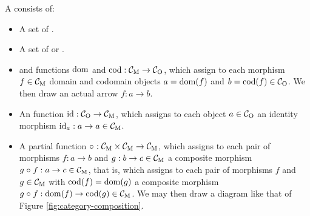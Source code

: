 \begin{definition}
  [Category]



  \label{def:category}


  A   consists of:
  \begin{itemize}
  \item

    A set of  .

  \item

    A set of  or  .

  \item

     and  functions $\operatorname{dom}$ and $\operatorname{cod}:
    \mathcal{C}_{\operatorname{M}} \to \mathcal{C}_{\operatorname{O}}$, which assign to each morphism $f \in
    \mathcal{C}_{\operatorname{M}}$ domain and codomain objects $a = \operatorname{dom}(f)$ and $b =
    \operatorname{cod}(f) \in \mathcal{C}_{\operatorname{O}}$. We then draw an actual arrow $f: a \to b$.

  \item

    An  function $\operatorname{id}: \mathcal{C}_{\operatorname{O}} \to \mathcal{C}_{\operatorname{M}}$, which
    assigns to each object $a \in \mathcal{C}_{\operatorname{O}}$ an identity morphism
    $\operatorname{id}_{a}: a \to a \in \mathcal{C}_{\operatorname{M}}$.

  \item

    A  partial function $\mathrel{\circ}\ : \mathcal{C}_{\operatorname{M}} \times
    \mathcal{C}_{\operatorname{M}} \to \mathcal{C}_{\operatorname{M}}$, which assigns to each pair of morphisms
    $f: a \to b$ and $g: b \to c \in \mathcal{C}_{\operatorname{M}}$ a composite morphism $g
    \mathrel{\circ} f: a \to c \in \mathcal{C}_{\operatorname{M}}$, that is, which assigns to each
    pair of morphisms $f$ and $g \in \mathcal{C}_{\operatorname{M}}$ with $\operatorname{cod}(f) =
    \operatorname{dom}(g)$ a composite morphism $g \mathrel{\circ} f: \operatorname{dom}(f) \to \operatorname{cod}(g) \in
    \mathcal{C}_{\operatorname{M}}$. We may then draw a diagram like that of Figure
    \ref{fig:category-composition}.

    \begin{figure}[htbp]
      \begin{center}
\end{center}
\end{figure}
\end{itemize}
\end{definition}

